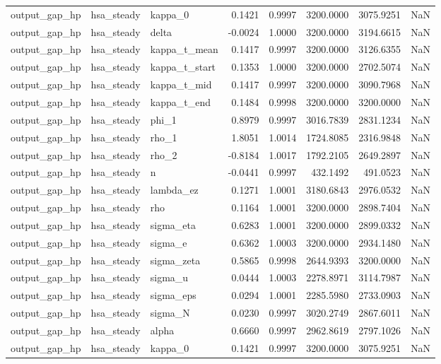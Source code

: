 \begin{tabular}{lllrrrrl}
output\_gap\_hp & hsa\_steady & kappa\_0 & 0.1421 & 0.9997 & 3200.0000 & 3075.9251 & NaN \\
output\_gap\_hp & hsa\_steady & delta & -0.0024 & 1.0000 & 3200.0000 & 3194.6615 & NaN \\
output\_gap\_hp & hsa\_steady & kappa\_t\_mean & 0.1417 & 0.9997 & 3200.0000 & 3126.6355 & NaN \\
output\_gap\_hp & hsa\_steady & kappa\_t\_start & 0.1353 & 1.0000 & 3200.0000 & 2702.5074 & NaN \\
output\_gap\_hp & hsa\_steady & kappa\_t\_mid & 0.1417 & 0.9997 & 3200.0000 & 3090.7968 & NaN \\
output\_gap\_hp & hsa\_steady & kappa\_t\_end & 0.1484 & 0.9998 & 3200.0000 & 3200.0000 & NaN \\
output\_gap\_hp & hsa\_steady & phi\_1 & 0.8979 & 0.9997 & 3016.7839 & 2831.1234 & NaN \\
output\_gap\_hp & hsa\_steady & rho\_1 & 1.8051 & 1.0014 & 1724.8085 & 2316.9848 & NaN \\
output\_gap\_hp & hsa\_steady & rho\_2 & -0.8184 & 1.0017 & 1792.2105 & 2649.2897 & NaN \\
output\_gap\_hp & hsa\_steady & n & -0.0441 & 0.9997 & 432.1492 & 491.0523 & NaN \\
output\_gap\_hp & hsa\_steady & lambda\_ez & 0.1271 & 1.0001 & 3180.6843 & 2976.0532 & NaN \\
output\_gap\_hp & hsa\_steady & rho & 0.1164 & 1.0001 & 3200.0000 & 2898.7404 & NaN \\
output\_gap\_hp & hsa\_steady & sigma\_eta & 0.6283 & 1.0001 & 3200.0000 & 2899.0332 & NaN \\
output\_gap\_hp & hsa\_steady & sigma\_e & 0.6362 & 1.0003 & 3200.0000 & 2934.1480 & NaN \\
output\_gap\_hp & hsa\_steady & sigma\_zeta & 0.5865 & 0.9998 & 2644.9393 & 3200.0000 & NaN \\
output\_gap\_hp & hsa\_steady & sigma\_u & 0.0444 & 1.0003 & 2278.8971 & 3114.7987 & NaN \\
output\_gap\_hp & hsa\_steady & sigma\_eps & 0.0294 & 1.0001 & 2285.5980 & 2733.0903 & NaN \\
output\_gap\_hp & hsa\_steady & sigma\_N & 0.0230 & 0.9997 & 3020.2749 & 2867.6011 & NaN \\
output\_gap\_hp & hsa\_steady & alpha & 0.6660 & 0.9997 & 2962.8619 & 2797.1026 & NaN \\
output\_gap\_hp & hsa\_steady & kappa\_0 & 0.1421 & 0.9997 & 3200.0000 & 3075.9251 & NaN \\

\end{tabular}
